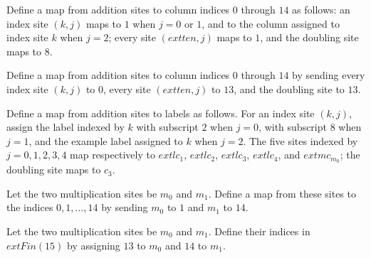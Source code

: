 \begin{definition}
\label{Complexity.LogProg.adY}
\leanok
{}
Define a map from addition sites to column indices $0$ through $14$ as follows: an index
site $(k,j)$ maps to $1$ when $j=0$ or $1$, and to the column assigned to index site $k$
when $j=2$; every site $(	ext{ten},j)$ maps to $1$, and the doubling site maps to $8$.
\end{definition}

\begin{definition}
\label{Complexity.LogProg.adP}
\leanok
{}
Define a map from addition sites to column indices $0$ through $14$ by sending every
index site $(k,j)$ to $0$, every site $(	ext{ten},j)$ to $13$, and the doubling site to
$13$.
\end{definition}

\begin{definition}
\label{Complexity.LogProg.adEx}
\leanok
{}
Define a map from addition sites to labels as follows. For an index site $(k,j)$, assign
the label indexed by $k$ with subscript $2$ when $j=0$, with subscript $8$ when $j=1$,
and the example label assigned to $k$ when $j=2$. The five sites indexed by
$j=0,1,2,3,4$ map respectively to $	ext{lc}_1$, $	ext{lc}_2$, $	ext{lc}_3$,
$	ext{lc}_4$, and $	ext{mc}_{m_0}$; the doubling site maps to $c_3$.
\end{definition}

\begin{definition}
\label{Complexity.LogProg.mulA}
\leanok
{}
Let the two multiplication sites be $m_0$ and $m_1$. Define a map from these sites to
the indices $0,1,\ldots,14$ by sending $m_0$ to $1$ and $m_1$ to $14$.
\end{definition}

\begin{definition}
\label{Complexity.LogProg.mulB}
\leanok
{}
Let the two multiplication sites be $m_0$ and $m_1$. Define their indices in
$	ext{Fin}(15)$ by assigning $13$ to $m_0$ and $14$ to $m_1$.
\end{definition}

